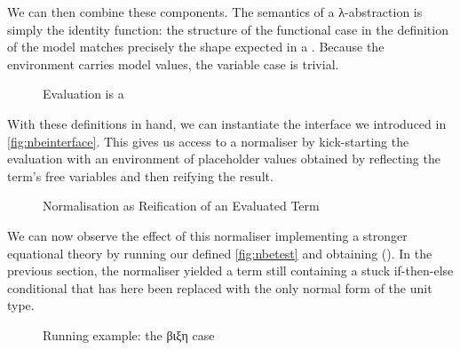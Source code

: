 We can then combine these components. The semantics of a λ-abstraction is
simply the identity function: the structure of the functional case in the
definition of the model matches precisely the shape expected in a
. Because the environment carries model values, the
variable case is trivial.

\begin{figure}[h]
\caption{Evaluation is a \label{fig:evalnbe}}
\end{figure}

With these definitions in hand, we can instantiate the  interface we
introduced in \cref{fig:nbeinterface}. This gives us access to a normaliser
by kick-starting the evaluation with an environment of placeholder values
obtained by reflecting the term's free variables and then reifying the
result.

\begin{figure}[h]
\caption{Normalisation as Reification of an Evaluated Term\label{fig:normnbe}}
\end{figure}

We can now observe the effect of this normaliser implementing a stronger
equational theory by running our  defined \cref{fig:nbetest} and
obtaining {()}. In the previous section, the normaliser
yielded a term still containing a stuck if-then-else conditional that has
here been replaced with the only normal form of the unit type.

\begin{figure}[h]
\caption{Running example: the βιξη case}\label{fig:betaiotaxietatest}
\end{figure}
